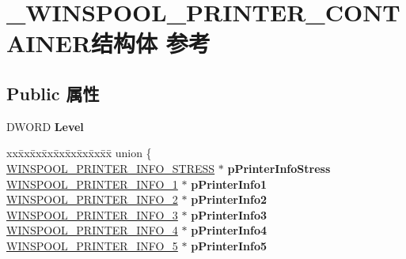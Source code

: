 \hypertarget{struct___w_i_n_s_p_o_o_l___p_r_i_n_t_e_r___c_o_n_t_a_i_n_e_r}{}\section{\+\_\+\+W\+I\+N\+S\+P\+O\+O\+L\+\_\+\+P\+R\+I\+N\+T\+E\+R\+\_\+\+C\+O\+N\+T\+A\+I\+N\+E\+R结构体 参考}
\label{struct___w_i_n_s_p_o_o_l___p_r_i_n_t_e_r___c_o_n_t_a_i_n_e_r}
\subsection*{Public 属性}
\begin{DoxyCompactItemize}
\item 
\mbox{\label{struct___w_i_n_s_p_o_o_l___p_r_i_n_t_e_r___c_o_n_t_a_i_n_e_r_a89b88b2b401e9e098231821d19b54836}} 
D\+W\+O\+RD {\bfseries Level}
\item 
\mbox{\label{struct___w_i_n_s_p_o_o_l___p_r_i_n_t_e_r___c_o_n_t_a_i_n_e_r_ada453c3ddb39cc2c3bf8aeab746c3c95}} 
\begin{tabbing}
xx\=xx\=xx\=xx\=xx\=xx\=xx\=xx\=xx\=\kill
union \{\\
\>\hyperlink{struct___w_i_n_s_p_o_o_l___p_r_i_n_t_e_r___i_n_f_o___s_t_r_e_s_s}{WINSPOOL\_PRINTER\_INFO\_STRESS} $\ast$ {\bfseries pPrinterInfoStress}\\
\>\hyperlink{struct___w_i_n_s_p_o_o_l___p_r_i_n_t_e_r___i_n_f_o__1}{WINSPOOL\_PRINTER\_INFO\_1} $\ast$ {\bfseries pPrinterInfo1}\\
\>\hyperlink{struct___w_i_n_s_p_o_o_l___p_r_i_n_t_e_r___i_n_f_o__2}{WINSPOOL\_PRINTER\_INFO\_2} $\ast$ {\bfseries pPrinterInfo2}\\
\>\hyperlink{struct___w_i_n_s_p_o_o_l___p_r_i_n_t_e_r___i_n_f_o__3}{WINSPOOL\_PRINTER\_INFO\_3} $\ast$ {\bfseries pPrinterInfo3}\\
\>\hyperlink{struct___w_i_n_s_p_o_o_l___p_r_i_n_t_e_r___i_n_f_o__4}{WINSPOOL\_PRINTER\_INFO\_4} $\ast$ {\bfseries pPrinterInfo4}\\
\>\hyperlink{struct___w_i_n_s_p_o_o_l___p_r_i_n_t_e_r___i_n_f_o__5}{WINSPOOL\_PRINTER\_INFO\_5} $\ast$ {\bfseries pPrinterInfo5}\\

\end{tabbing}
\end{DoxyCompactItemize}
